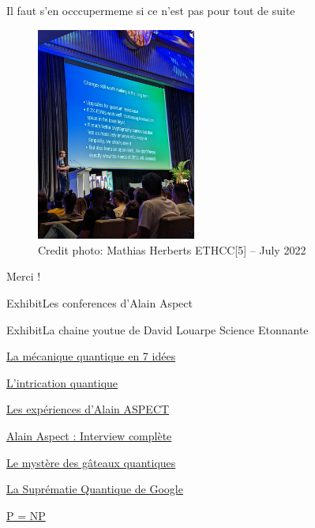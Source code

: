 \documentclass{beamer}
\begin{document}
\begin{frame}{Il faut s'en occcuper}{meme si ce n'est pas pour tout de suite}
  \begin{center}
    \begin{figure}
      \includegraphics[height=7cm]{eth.jpg}
      \caption*{Credit photo: Mathias Herberts ETHCC[5] -- July 2022}
    \end{figure}
  \end{center}
\end{frame}

\begin{frame}
        Merci !
\end{frame}

\begin{frame}{Exhibit}{Les conferences d'Alain Aspect}

\end{frame}

\begin{frame}{Exhibit}{La chaine youtue de David Louarpe Science Etonnante}
  \begin{description}
  \item \href{https://www.youtube.com/watch?v=Rj3jTw2DxXQ&t=3s}{La mécanique quantique en 7 idées}
  \item \href{https://www.youtube.com/watch?v=5R6k2mEacZo&t=8s}{L'intrication quantique}
  \item \href{https://www.youtube.com/watch?v=hB1kmGzpIrw}{Les expériences d'Alain ASPECT}
  \item \href{https://www.youtube.com/watch?v=OeZ_63iKPho&t=556s}{Alain Aspect : Interview complète}
  \item \href{https://www.youtube.com/watch?v=hB1kmGzpIrw}{Le mystère des gâteaux quantiques}
  \item \href{https://www.youtube.com/watch?v=KaRd_eB2qOA}{La Suprématie Quantique de Google}
  \item \href{https://www.youtube.com/watch?v=AgtOCNCejQ8}{P = NP}
  \end{description}
\end{frame}
\end{document}
